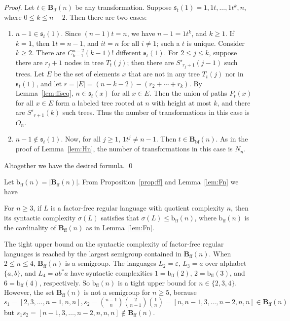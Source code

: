 \documentclass{llncs}
\renewcommand{\le}{\leqslant}
\renewcommand{\ge}{\geqslant}
\newcommand{\eps}{\varepsilon}
\newcommand{\be}{\begin{enumerate}}
\newcommand{\ee}{\end{enumerate}}
\newcommand{\seq}{{\mathfrak{s}}}
\newcommand{\tpath}{P}
\newcommand{\Bbf}{\mathbf{B}_{\mathrm{bf}}}
\newcommand{\Bff}{\mathbf{B}_{\mathrm{ff}}}
\newcommand{\bff}{{\mathrm{b}_{\mathrm{ff}}}}
\begin{document}
\begin{proof} 
Let $t \in \Bff(n)$ be any transformation. Suppose $\seq_t(1) = 1,1t,\ldots,1t^k,n$, where $0 \le k \le n-2$. Then there are two cases: 

\be 
\item $n-1 \in \seq_t(1)$. Since $(n-1)t = n$, we have $n-1 = 1t^k$, and $k \ge 1$. If $k = 1$, then $1t = n-1$, and $it = n$ for all $i \neq 1$; such a $t$ is unique. Consider $k \ge 2$. There are $C^{n-2}_{k-1} (k-1)!$ different $\seq_t(1)$. For $2 \le j \le k$, suppose there are $r_j + 1$ nodes in tree $T_t(j)$; then there are $S'_{r_j+1}(j-1)$ such trees. Let $E$ be the set of elements $x$ that are not in any tree $T_t(j)$ nor in $\seq_t(1)$, and let $r = |E| = (n-k-2) - (r_2 + \cdots + r_k)$. By Lemma~\ref{lem:ffseq}, $n \in \seq_t(x)$ for all $x \in E$. Then the union of paths $\tpath_t(x)$ for all $x \in E$ form a labeled tree rooted at $n$ with height at most $k$, and there are $S'_{r+1}(k)$ such trees. Thus the number of transformations in this case is $O_n$. 

\item $n-1 \not\in \seq_t(1)$. Now, for all $j \ge 1$, $1t^j \neq n-1$. Then $t \in \Bbf(n)$. As in the proof of Lemma~\ref{lem:Hn}, the number of transformations in this case is $N_n$. 

\ee

Altogether we have the desired formula. \qed
\end{proof}

Let $\bff(n) = |\Bff(n)|$. From Proposition~\ref{prop:ff} and Lemma~\ref{lem:Fn} we have 
\begin{proposition}\label{prop:Fncard} 
For $n \ge 3$, if $L$ is a factor-free regular language with quotient complexity $n$, then its syntactic complexity $\sigma(L)$ satisfies that $\sigma(L) \le \bff(n)$, where $\bff(n)$ is the cardinality of $\Bff(n)$ as in Lemma~\ref{lem:Fn}.
\end{proposition} 

The tight upper bound on the syntactic complexity of factor-free regular languages is reached by the largest semigroup contained in $\Bff(n)$. When $2 \le n \le 4$, $\Bff(n)$ is a semigroup. The languages $L_2 = \eps$, $L_3 = a$ over alphabet $\{a,b\}$, and $L_4 = ab^*a$ have syntactic complexities $1 = \bff(2)$, $2 = \bff(3)$, and $6 = \bff(4)$, respectively. So $\bff(n)$ is a tight upper bound for $n \in \{2,3,4\}$. However, the set $\Bff(n)$ is not a semigroup for $n \ge 5$, because $s_1 = [2,3,\ldots,n-1,n,n], s_2 = {n-1 \choose n}{2 \choose n-1}{1 \choose n} = [n,n-1,3,\ldots,n-2,n,n] \in \Bff(n)$ but $s_1s_2 = [n-1,3,\ldots,n-2,n,n,n] \not\in \Bff(n)$. 
\end{document}
